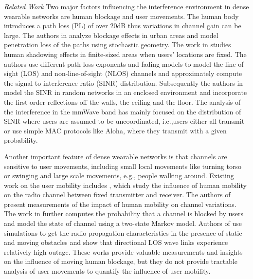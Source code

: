 \documentclass[10pt, conference, letterpaper]{IEEEtran}
\begin{document}
\emph{Related Work}
Two major factors influencing the interference environment in dense wearable networks are human blockage and user movements. The human body introduces a path loss (PL) of over 20dB \cite{humanshadowing} thus variations in channel gain can be large. The authors in \cite{urbanblockage} analyze blockage effects in urban areas and model penetration loss of the paths using stochastic geometry. The work in \cite{interferencefinitesized} studies human shadowing effects in finite-sized areas when users' locations are fixed. The authors use different path loss exponents and fading models to model the line-of-sight (LOS) and non-line-of-sight (NLOS) channels and approximately compute the signal-to-interference-ratio (SINR) distribution. Subsequently the authors in \cite{enclosedmmwave} model the SINR in random networks in an enclosed environment and incorporate the first order reflections off the walls, the ceiling and the floor. The analysis of the interference in the mmWave band has mainly focused on the distribution of SINR where users are assumed to be uncoordinated, i.e.,users  either all transmit or use simple MAC protocols like Aloha, where they transmit with a given probability. 

Another important feature of dense wearable networks is that channels are sensitive to user movements, including small local movements like turning torso or swinging and large scale movements, e.g., people walking around. Existing work on the user mobility includes \cite{humanactivity}\cite{timevaryingpathshadowing}\cite{blockagein60ghz}, which study the influence of human mobility on the radio channel between fixed transmitter and receiver. The authors of \cite{humanactivity}\cite{timevaryingpathshadowing} present measurements of the impact of human mobility on channel variations. 
The work in \cite{timevaryingpathshadowing} further computes the probability that a channel is blocked by users and model the state of channel using a two-state Markov model. 
Authors of \cite{blockagein60ghz} use simulations to get the radio propagation characteristics in the presence of static and moving obstacles and show that directional LOS wave links experience relatively high outage. 
These works provide valuable measurements and insights on the influence of moving human blockage, but they do not provide tractable analysis of user movements to quantify the influence of user mobility.
\end{document}
